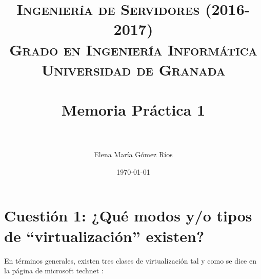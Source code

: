 


\title{	
\normalfont \normalsize 
\textsc{\textbf{Ingeniería de Servidores (2016-2017)} \\ Grado en Ingeniería Informática \\ Universidad de Granada} \\ [25pt] %
\horrule{0.5pt} \\[0.4cm] %
\huge Memoria Práctica 1 \\ %
\horrule{2pt} \\[0.5cm] %
}

\author{Elena María Gómez Ríos} %

\date{\normalsize\today} %




\maketitle %

\newpage %

\tableofcontents %

\listoffigures

\listoftables

\newpage

 


\newpage


\section{Cuestión 1: ¿Qué modos y/o tipos de ``virtualización'' existen?}
En términos generales, existen tres clases de virtualización tal y como se dice en la página de microsoft technet \cite{tiposVirtualizacion}:

